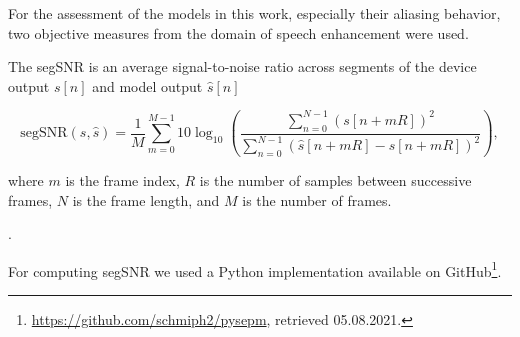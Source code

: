For the assessment of the models in this work, especially their aliasing behavior, two objective measures from the domain of speech enhancement were used.

The \ac{segSNR} is an average signal-to-noise ratio across segments of the device output $s[n]$ and model output $\hat{s}[n]$ \cite{Hansen98}

\begin{equation}
    \text{segSNR}(s, \hat{s}) = \frac{1}{M} \sum \limits_{m=0}^{M-1} 10 \log_{10} \left( \frac{\sum_{n=0}^{N-1} (s[n+mR])^2}{\sum_{n=0}^{N-1} (\hat{s}[n+mR] - s[n+mR])^2} \right),
    \label{eq:seg_snr}
\end{equation}

where $m$ is the frame index, $R$ is the number of samples between successive frames, $N$ is the frame length, and $M$ is the number of frames.

\cite{ITU1387}.





For computing \ac{segSNR} we used a Python implementation available on GitHub\footnote{\url{https://github.com/schmiph2/pysepm}, retrieved 05.08.2021.}.

